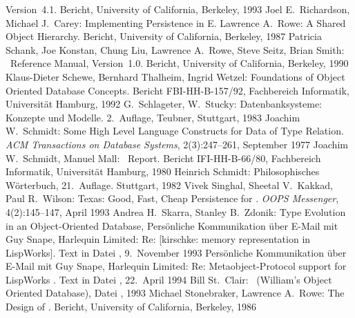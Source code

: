 \begin{thebibliography}{Stonebraker \etal\ 86a}
Version~4.1.
Bericht, University of California, Berkeley, 1993
%
Joel E.\ Richardson, Michael J.\ Carey:
Implementing Persistence in E.
%
Lawrence A.\ Rowe:
A Shared Object Hierarchy.
Bericht, University of California, Berkeley, 1987
%
Patricia Schank, Joe Konstan, Chung Liu, Lawrence A.\ Rowe, Steve
Seitz, Brian Smith:
\picasso\ Reference Manual,
Version~1.0.
Bericht, University of California, Berkeley, 1990
%
Klaus-Dieter Schewe, Bernhard Thalheim, Ingrid Wetzel:
Foundations of Object Oriented Database Concepts.
Bericht FBI-HH-B-157/92,
Fachbereich Informatik, Universit\"{a}t Hamburg,
1992
%
G.\ Schlageter, W.\ Stucky:
Datenbanksysteme: Konzepte und Modelle.
2.~Auf\-la\-ge,
Teubner, Stuttgart, 1983
%
Joachim W.\ Schmidt:
Some High Level Language Constructs for Data of Type Relation.
{\em ACM Transactions on Database Systems\/},
2(3):247--261, September 1977
%
Joachim W.\ Schmidt, Manuel Mall:
\pascalr\ Report.
Bericht IFI-HH-B-66/80,
Fachbereich Informatik, Universit\"{a}t Hamburg,
1980
%
Heinrich Schmidt:
Philosophisches W\"{o}rterbuch,
21.~Auf\-la\-ge.
Stuttgart, 1982
%
Vivek Singhal, Sheetal V.\ Kakkad, Paul R.\ Wilson:
Texas: Good, Fast, Cheap Persistence for \cpp.
{\em OOPS Messenger\/},
4(2):145--147, April 1993
%
Andrea H.\ Skarra, Stanley B.\ Zdonik:
Type Evolution in an Object-Oriented Database,
%
Pers\"{o}nliche Kommunikation \"{u}ber E-Mail mit Guy Snape, Harlequin
Limited:
Re: [kirschke: memory representation in LispWorks].
Text in Datei ,
9.~November 1993
%
Pers\"{o}nliche Kommunikation \"{u}ber E-Mail mit Guy Snape, Harlequin
Limited:
Re: Metaobject-Protocol support for LispWorks \clos.
Text in Datei ,
22.~April 1994
%
Bill St.\ Clair:
\wood\ (William's Object Oriented Database),
Datei , 1993
%
Michael Stonebraker, Lawrence A.\ Rowe:
The Design of \postgres.
Bericht, University of California, Berkeley, 1986

\end{thebibliography}
